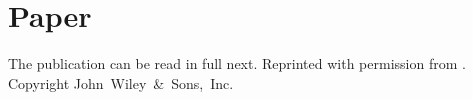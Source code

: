 




\section{Paper}

The publication can be read in full next.
Reprinted with permission from
.
Copyright
\citeyear{Schneider2022}
John~Wiley~\&~Sons,~Inc.



